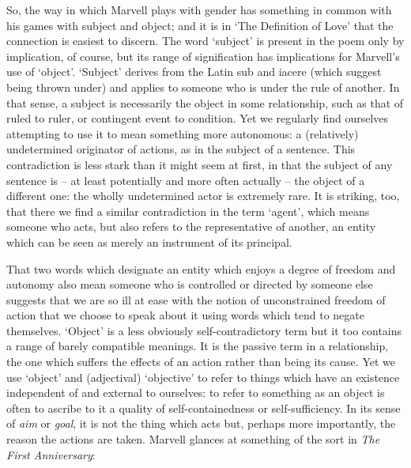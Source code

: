 ﻿\documentclass[12pt]{article}
\newcommand{\citedtitle}[1]{\textit{#1}}
\begin{document}
So,
the way in which Marvell plays with gender has something in common with his
games with subject and object; and it is in ‘The Definition of Love’ that the
connection is easiest to discern. The word ‘subject’ is present in the poem
only by implication, of course, but its range of signification has implications
for Marvell’s use of ‘object’. ‘Subject’ derives from the Latin sub and iacere
(which suggest being thrown under) and applies to someone who is under the rule
of another. In that sense, a subject is necessarily the object in some
relationship, such as that of ruled to ruler, or contingent event to condition.
Yet we regularly find ourselves attempting to use it to mean something more
autonomous: a (relatively) undetermined originator of actions, as in the
subject of a sentence. This contradiction is less stark than it might seem at
first, in that the subject of any sentence is – at least potentially and more
often actually – the object of a different one: the wholly undetermined actor
is extremely rare. It is striking, too, that there we find a similar
contradiction in the term ‘agent’, which means someone who acts, but also
refers to the representative of another, an entity which can be seen as merely
an instrument of its principal.

That
two words which designate an entity which enjoys a degree of freedom and
autonomy also mean someone who is controlled or directed by someone else
suggests that we are so ill at ease with the notion of unconstrained freedom of
action that we choose to speak about it using words which tend to negate
themselves. ‘Object’ is a less obviously self-contradictory term but it too
contains a range of barely compatible meanings. It is the passive term in a
relationship, the one which suffers the effects of an action rather than being
its cause. Yet we use ‘object’ and (adjectival) ‘objective’ to refer to things
which have an existence independent of and external to ourselves:  to refer to
something as an object is often to ascribe to it a quality of
self-containedness or self-sufficiency. In its sense of \emph{aim} or \emph{goal}, it is not the thing
which acts but, perhaps more importantly, the reason the actions are taken.
Marvell glances at something of the sort in \citedtitle{The First Anniversary}:
\end{document}
